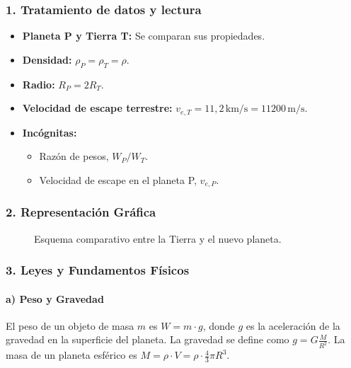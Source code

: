 \subsubsection*{1. Tratamiento de datos y lectura}
\begin{itemize}
    \item \textbf{Planeta P y Tierra T:} Se comparan sus propiedades.
    \item \textbf{Densidad:} $\rho_P = \rho_T = \rho$.
    \item \textbf{Radio:} $R_P = 2 R_T$.
    \item \textbf{Velocidad de escape terrestre:} $v_{e,T} = 11,2 \, \text{km/s} = 11200 \, \text{m/s}$.
    \item \textbf{Incógnitas:}
        \begin{itemize}
            \item Razón de pesos, $W_P / W_T$.
            \item Velocidad de escape en el planeta P, $v_{e,P}$.
        \end{itemize}
\end{itemize}

\subsubsection*{2. Representación Gráfica}
\begin{figure}[H]
    \centering
    \caption{Esquema comparativo entre la Tierra y el nuevo planeta.}
\end{figure}

\subsubsection*{3. Leyes y Fundamentos Físicos}
\paragraph*{a) Peso y Gravedad}
El peso de un objeto de masa $m$ es $W = m \cdot g$, donde $g$ es la aceleración de la gravedad en la superficie del planeta. La gravedad se define como $g = G\frac{M}{R^2}$. La masa de un planeta esférico es $M = \rho \cdot V = \rho \cdot \frac{4}{3}\pi R^3$.
